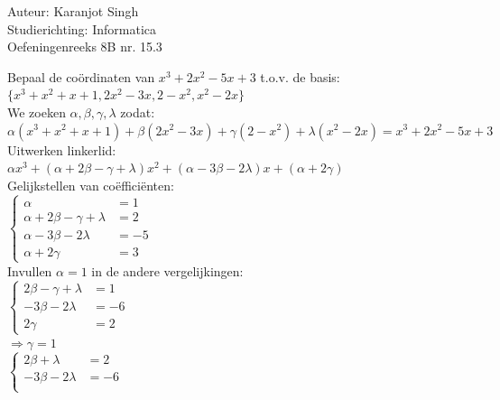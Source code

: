 \documentclass[a4paper]{article}
\begin{document}
\noindent \large Auteur: Karanjot Singh \\
\noindent \large Studierichting: Informatica \\
\noindent \large Oefeningenreeks 8B nr. 15.3 \\

\normalsize

Bepaal de coördinaten van $x^3 + 2x^2 - 5x + 3$ t.o.v. de basis:\\

$\{x^3 + x^2 + x + 1,2x^2 - 3x,2 - x^2,x^2 - 2x\}$\\

We zoeken $\alpha, \beta, \gamma, \lambda$ zodat:\\

$\alpha(x^3 + x^2 + x + 1) + \beta(2x^2 - 3x) + \gamma(2 - x^2) + \lambda(x^2 - 2x) = x^3 + 2x^2 - 5x + 3$\\

Uitwerken linkerlid:\\

$\alpha x^3 + (\alpha + 2\beta - \gamma + \lambda)x^2 + (\alpha - 3\beta - 2\lambda)x + (\alpha + 2\gamma)$\\

Gelijkstellen van coëfficiënten:\\

$\left\{
\begin{array}{rl}
\alpha &= 1 \\
\alpha + 2\beta - \gamma + \lambda &= 2 \\
\alpha - 3\beta - 2\lambda &= -5 \\
\alpha + 2\gamma &= 3
\end{array}
\right.$\\

Invullen $\alpha = 1$ in de andere vergelijkingen:\\

$\left\{
\begin{array}{rl}
2\beta - \gamma + \lambda &= 1 \\
-3\beta - 2\lambda &= -6 \\
2\gamma &= 2
\end{array}
\right.$\\

$\Rightarrow \gamma = 1$\\

$\left\{
\begin{array}{rl}
2\beta + \lambda &= 2 \\
-3\beta - 2\lambda &= -6\\
\end{array}
\right.$\\
\end{document}
